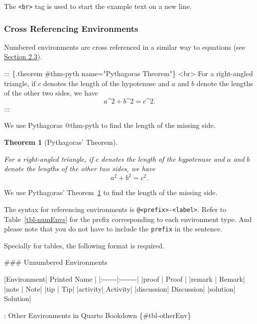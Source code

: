 \documentclass[
  letterpaper,
  oneside]{book}
\newenvironment{Shaded}{\begin{snugshade}}{\end{snugshade}}
\newcommand{\FunctionTok}[1]{\textcolor[rgb]{0.28,0.35,0.67}{#1}}
\newcommand{\NormalTok}[1]{\textcolor[rgb]{0.00,0.23,0.31}{#1}}
\numberwithin{equation}{section}
\numberwithin{figure}{section}
\theoremstyle{break}
\theoremstyle{plain}
\newtheorem{theorem}{Theorem}[chapter]
\theoremstyle{remark}
\begin{document}
The \texttt{\textless{}br\textgreater{}} tag is used to start the
example text on a new line.

\subsubsection*{Cross Referencing
Environments}\label{cross-referencing-environments}

Numbered environments are cross referenced in a similar way to equations
(see \hyperref[mathematics]{Section 2.3}).

\begin{Shaded}
\begin{Highlighting}[]
\NormalTok{::: \{.theorem \#thm{-}pyth name="Pythagoras\textquotesingle{} Theorem"\}}
\NormalTok{\textless{}br\textgreater{}}
\NormalTok{For a right{-}angled triangle, if $c$ denotes the length of the hypotenuse}
\NormalTok{and $a$ and $b$ denote the lengths of the other two sides, we have}
\NormalTok{$$a\^{}2 + b\^{}2 = c\^{}2.$$}
\NormalTok{:::}
  
\NormalTok{We use Pythagoras\textquotesingle{} @thm{-}pyth to find the length of the missing side.}
\end{Highlighting}
\end{Shaded}

\begin{theorem}[Pythagoras'
Theorem]\protect\hypertarget{thm-pyth}{}\label{thm-pyth}

For a right-angled triangle, if \(c\) denotes the length of the
hypotenuse and \(a\) and \(b\) denote the lengths of the other two
sides, we have \[a^2 + b^2 = c^2.\]

\end{theorem}

We use Pythagoras' Theorem~\ref{thm-pyth} to find the length of the
missing side.

The syntax for referencing environments is
\texttt{@\textless{}prefix\textgreater{}-\textless{}label\textgreater{}}.
Refer to Table~\ref{tbl-numEnvs} for the prefix corresponding to each
environment type. And please note that you do not have to include the
\texttt{prefix} in the sentence.

Specially for tables, the following format is required.

\begin{Shaded}
\begin{Highlighting}[]

\FunctionTok{\#\#\# Unnumbered Environments}

\NormalTok{|Environment| Printed Name |}
\NormalTok{|:{-}{-}{-}{-}{-}{-}|:{-}{-}{-}{-}{-}{-}{-}|}
\NormalTok{|proof | Proof |}
\NormalTok{|remark | Remark|}
\NormalTok{|note | Note|}
\NormalTok{|tip | Tip|}
\NormalTok{|activity| Activity|}
\NormalTok{|discussion| Discussion|}
\NormalTok{|solution| Solution|}

\NormalTok{: Other Environments in Quarto Bookdown \{\#tbl{-}otherEnv\}}
\end{Highlighting}
\end{Shaded}
\end{document}
